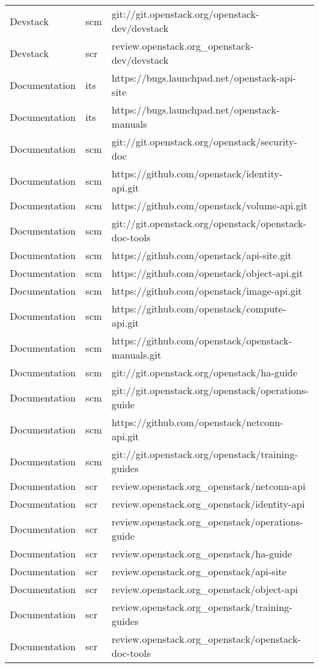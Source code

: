 \begin{center}
\begin{longtable}{|p{4cm}|p{1cm}|p{10cm}|}
Devstack&scm&git://git.openstack.org/openstack-dev/devstack\\ 
Devstack&scr&review.openstack.org\_openstack-dev/devstack\\ 
Documentation&its&https://bugs.launchpad.net/openstack-api-site\\ 
Documentation&its&https://bugs.launchpad.net/openstack-manuals\\ 
Documentation&scm&git://git.openstack.org/openstack/security-doc\\ 
Documentation&scm&https://github.com/openstack/identity-api.git\\ 
Documentation&scm&https://github.com/openstack/volume-api.git\\ 
Documentation&scm&git://git.openstack.org/openstack/openstack-doc-tools\\ 
Documentation&scm&https://github.com/openstack/api-site.git\\ 
Documentation&scm&https://github.com/openstack/object-api.git\\ 
Documentation&scm&https://github.com/openstack/image-api.git\\ 
Documentation&scm&https://github.com/openstack/compute-api.git\\ 
Documentation&scm&https://github.com/openstack/openstack-manuals.git\\ 
Documentation&scm&git://git.openstack.org/openstack/ha-guide\\ 
Documentation&scm&git://git.openstack.org/openstack/operations-guide\\ 
Documentation&scm&https://github.com/openstack/netconn-api.git\\ 
Documentation&scm&git://git.openstack.org/openstack/training-guides\\ 
Documentation&scr&review.openstack.org\_openstack/netconn-api\\ 
Documentation&scr&review.openstack.org\_openstack/identity-api\\ 
Documentation&scr&review.openstack.org\_openstack/operations-guide\\ 
Documentation&scr&review.openstack.org\_openstack/ha-guide\\ 
Documentation&scr&review.openstack.org\_openstack/api-site\\ 
Documentation&scr&review.openstack.org\_openstack/object-api\\ 
Documentation&scr&review.openstack.org\_openstack/training-guides\\ 
Documentation&scr&review.openstack.org\_openstack/openstack-doc-tools\\ 

\end{longtable}
\end{center}
